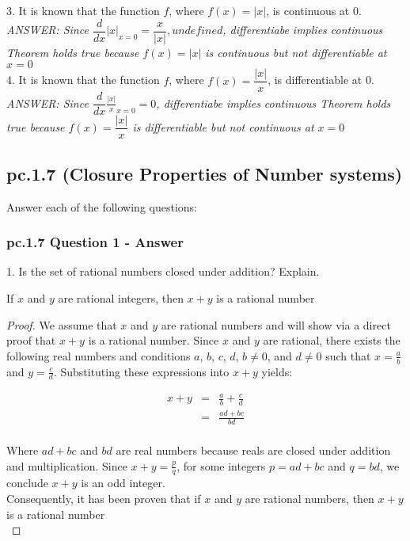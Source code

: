 3. It is known that the function $f$, where $f(x)= |x|$, is continuous at 0. \\
{\it ANSWER: Since $\dfrac{d}{dx}|x|_{x=0} = \dfrac{x}{|x|}, undefined$, differentiabe implies continuous Theorem holds true because $f(x)= |x|$ is continuous but not differentiable at $x=0$ } \\


4. It is known that the function $f$, where $f(x)= \dfrac{|x|}{x}$, is differentiable at 0. \\
{\it ANSWER: Since $\dfrac{d}{dx}\frac{|x|}{x}_{x=0} = 0$, differentiabe implies continuous Theorem holds true because $f(x)= \dfrac{|x|}{x}$ is differentiable but not continuous at $x=0$ } \\
		
\newpage
\subsection{pc.1.7 (Closure Properties of Number systems)}

Answer each of the following questions: \\

\subsubsection*{pc.1.7 Question 1 - Answer}

1. Is the set of rational numbers closed under addition? Explain. \\

\begin{tcolorbox}
\begin{theorem}
If $x$ and $y$ are rational integers, then $x + y$ is a rational number
\end{theorem}
\end{tcolorbox}

\begin{proof}
We assume that $x$ and $y$ are rational numbers and will show via a direct proof that $x + y$ is a rational number. Since $x$ and $y$ are rational, there exists the following real numbers and conditions $a$, $b$, $c$, $d$,  $b \neq 0$, and $d \neq 0$ such that $x = \frac{a}{b}$ and $y = \frac{c}{d}$. Substituting these expressions into $x + y$ yields:

\begin{eqnarray*}
x + y & = & \frac{a}{b} + \frac{c}{d} \nonumber \\
& = & \frac{ad + bc}{bd} \nonumber \\
\end{eqnarray*}

Where $ad + bc$ and $bd$ are real numbers because reals are closed under addition and multiplication. Since $x + y = \frac{p}{q}$, for some integers $p = ad + bc$ and $q = bd$, we conclude $x + y$ is an odd integer. \\
Consequently, it has been proven that if $x$ and $y$ are rational numbers, then $x + y$ is a rational number \\
\end{proof}



